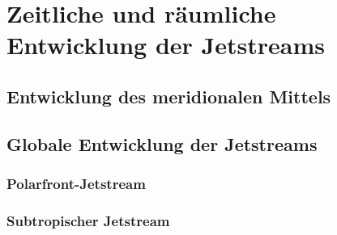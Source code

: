 
\chapter{Zeitliche und räumliche Entwicklung der Jetstreams}

\section{Entwicklung des meridionalen Mittels}
\blindtext

\section{Globale Entwicklung der Jetstreams}
\blindtext

\subsection{Polarfront-Jetstream}
\blindtext

\subsection{Subtropischer Jetstream}
\blindtext
